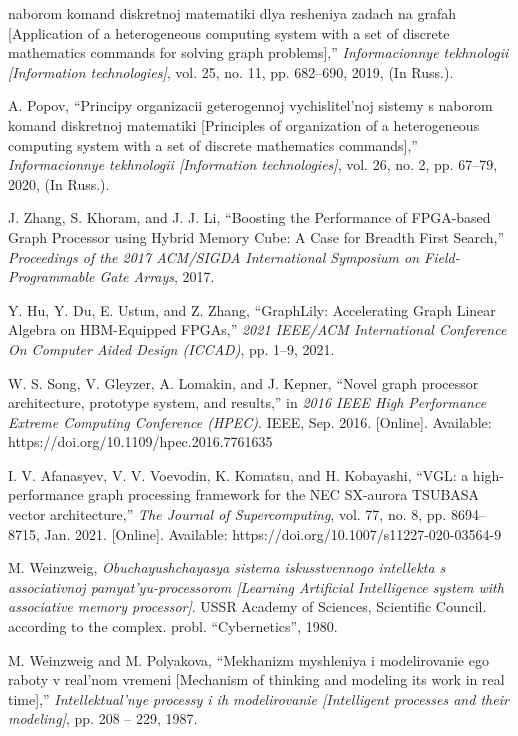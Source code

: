 \documentclass{article}
\begin{document}
{\begin{multicols}{2}
{\begin{enumerate}[label={[\arabic*]}]
naborom komand diskretnoj matematiki dlya resheniya zadach
na grafah [Application of a heterogeneous computing system
with a set of discrete mathematics commands for solving
graph problems],” \textit{Informacionnye tekhnologii [Information
technologies]}, vol. 25, no. 11, pp. 682–690, 2019, (In Russ.).
    \item A. Popov, “Principy organizacii geterogennoj vychislitel’noj
sistemy s naborom komand diskretnoj matematiki [Principles
of organization of a heterogeneous computing system with a set
of discrete mathematics commands],” \textit{Informacionnye tekhnologii
[Information technologies]}, vol. 26, no. 2, pp. 67–79, 2020, (In
Russ.).
    \item J. Zhang, S. Khoram, and J. J. Li, “Boosting the Performance of
FPGA-based Graph Processor using Hybrid Memory Cube: A Case
for Breadth First Search,” \textit{Proceedings of the 2017 ACM/SIGDA
International Symposium on Field-Programmable Gate Arrays},
2017.
    \item Y. Hu, Y. Du, E. Ustun, and Z. Zhang, “GraphLily: Accelerating Graph Linear Algebra on HBM-Equipped FPGAs,” \textit{2021
IEEE/ACM International Conference On Computer Aided Design
(ICCAD)}, pp. 1–9, 2021.
    \item W. S. Song, V. Gleyzer, A. Lomakin, and J. Kepner,
“Novel graph processor architecture, prototype system, and
results,” in \textit{2016 IEEE High Performance Extreme Computing
Conference (HPEC)}. IEEE, Sep. 2016. [Online]. Available:
https://doi.org/10.1109/hpec.2016.7761635
    \item I. V. Afanasyev, V. V. Voevodin, K. Komatsu, and H. Kobayashi,
“VGL: a high-performance graph processing framework for the
NEC SX-aurora TSUBASA vector architecture,” \textit{The Journal
of Supercomputing}, vol. 77, no. 8, pp. 8694–8715, Jan. 2021.
[Online]. Available: https://doi.org/10.1007/s11227-020-03564-9
    \item M. Weinzweig, \textit{Obuchayushchayasya sistema iskusstvennogo
intellekta s associativnoj pamyat’yu-processorom [Learning Artificial Intelligence system with associative memory processor]}.
USSR Academy of Sciences, Scientific Council. according to the
complex. probl. “Cybernetics”, 1980.
    \item M. Weinzweig and M. Polyakova, “Mekhanizm myshleniya i
modelirovanie ego raboty v real’nom vremeni [Mechanism of
thinking and modeling its work in real time],” \textit{Intellektual’nye
processy i ih modelirovanie [Intelligent processes and their
modeling]}, pp. 208 – 229, 1987.


\end{enumerate}}
\end{multicols}}
\end{document}
